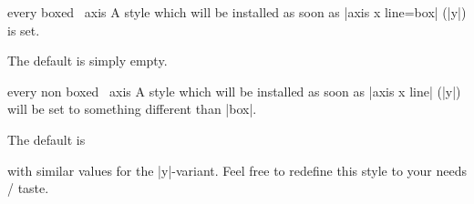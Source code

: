 \begin{pgfplotsxykey}{every boxed \x\ axis}
	A style which will be installed as soon as |axis x line=box| (|y|) is set.

	The default is simply empty.
\end{pgfplotsxykey}
\begin{pgfplotsxykey}{every non boxed \x\ axis}
	A style which will be installed as soon as |axis x line| (|y|) will be set to something different than |box|. 
	
	The default is 
\begin{codeexample}
\end{codeexample}
	\noindent with similar values for the |y|-variant. Feel free to redefine this style to your needs / taste.
\end{pgfplotsxykey}


